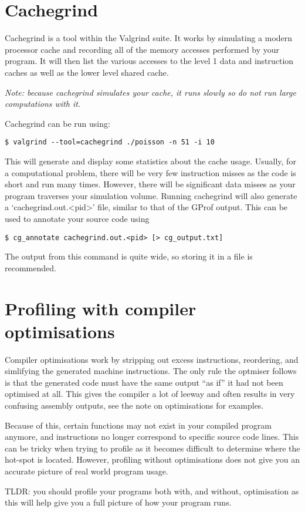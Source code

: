 \documentclass[a4paper,11pt]{article}
\begin{document}
\section{Cachegrind}

Cachegrind is a tool within the Valgrind suite. It works by simulating a modern
processor cache and recording all of the memory accesses performed by your
program. It will then list the various accesses to the level 1 data and
instruction caches as well as the lower level shared cache.

\emph{Note: because cachegrind \emph{simulates} your cache, it runs slowly so
do not run large computations with it.}

Cachegrind can be run using:

\begin{verbatim}
$ valgrind --tool=cachegrind ./poisson -n 51 -i 10
\end{verbatim}

This will generate and display some statistics about the cache usage. Usually,
for a computational problem, there will be very few instruction misses as the
code is short and run many times. However, there will be significant data misses
as your program traverses your simulation volume. Running cachegrind will also
generate a `cachegrind.out.<pid>' file, similar to that of the GProf output.
This can be used to annotate your source code using

\begin{verbatim}
$ cg_annotate cachegrind.out.<pid> [> cg_output.txt]
\end{verbatim}

The output from this command is quite wide, so storing it in a file is
recommended.


\section{Profiling with compiler optimisations}

Compiler optimisations work by stripping out excess instructions,
reordering, and simlifying the generated machine instructions. The
only rule the optmiser follows is that the generated code must have
the same output ``as if'' it had not been optimised at all. This gives
the compiler a lot of leeway and often results in very confusing
assembly outputs, see the note on optimisations for examples.

Because of this, certain functions may not exist in your compiled program
anymore, and instructions no longer correspond to specific source code lines.
This can be tricky when trying to profile as it becomes difficult to determine
where the hot-spot is located. However, profiling without optimisations does not
give you an accurate picture of real world program usage.

TLDR: you should profile your programs both with, and without, optimisation
as this will help give you a full picture of how your program runs.
\end{document}
